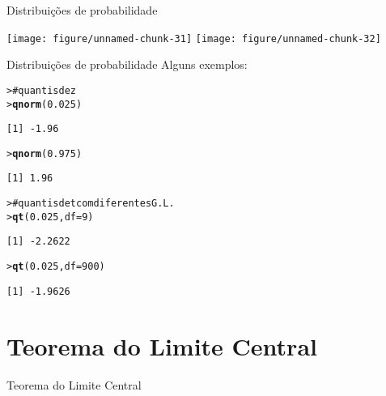 \documentclass[10pt]{beamer}\usepackage{graphicx, color}
\makeatletter
\newcommand{\hlfunctioncall}[1]{\textcolor[rgb]{0,0,0.545098039215686}{\textbf{#1}}}%
\newcommand{\hlcomment}[1]{\textcolor[rgb]{0.2,0.2,0.2}{#1}}%
\newenvironment{kframe}{%
 \def\at@end@of@kframe{}%
 \ifinner\ifhmode%
  \def\at@end@of@kframe{\end{minipage}}%
  \begin{minipage}{\columnwidth}%
 \fi\fi%
 \def\FrameCommand##1{\hskip\@totalleftmargin \hskip-\fboxsep
 \colorbox{shadecolor}{##1}\hskip-\fboxsep
     \hskip-\linewidth \hskip-\@totalleftmargin \hskip\columnwidth}%
 \MakeFramed {\advance\hsize-\width
   \@totalleftmargin\z@ \linewidth\hsize
   \@setminipage}}%
 {\par\unskip\endMakeFramed%
 \at@end@of@kframe}
\newenvironment{knitrout}{}{} %
\makeatother
\begin{document}
\begin{frame}[fragile=singleslide]{Distribuições de probabilidade}
\begin{knitrout}\small
{}\color{fgcolor}

{\centering \texttt{[image: figure/unnamed-chunk-31]} 
\texttt{[image: figure/unnamed-chunk-32]} 

}



\end{knitrout}

\end{frame}

\begin{frame}[fragile=singleslide]{Distribuições de probabilidade}
Alguns exemplos:
\begin{knitrout}\small
{}\color{fgcolor}\begin{kframe}
\begin{alltt}
> \hlcomment{# quantis de z}
> \hlfunctioncall{qnorm}(0.025)
\end{alltt}
\begin{verbatim}
[1] -1.96
\end{verbatim}
\begin{alltt}
> \hlfunctioncall{qnorm}(0.975)
\end{alltt}
\begin{verbatim}
[1] 1.96
\end{verbatim}
\begin{alltt}
> \hlcomment{# quantis de t com diferentes G.L.}
> \hlfunctioncall{qt}(0.025, df = 9)
\end{alltt}
\begin{verbatim}
[1] -2.2622
\end{verbatim}
\begin{alltt}
> \hlfunctioncall{qt}(0.025,df = 900)
\end{alltt}
\begin{verbatim}
[1] -1.9626
\end{verbatim}
\end{kframe}
\end{knitrout}

\end{frame}


\section{Teorema do Limite Central}
\label{sec:tlc}

\begin{frame}{Teorema do Limite Central}

\end{frame}
\end{document}

